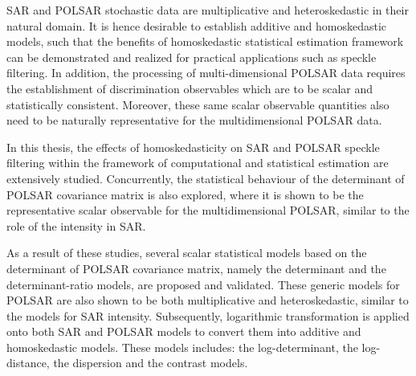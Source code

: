 

\begin{abstracts}        %
{}

SAR and POLSAR stochastic data are multiplicative and heteroskedastic in their natural domain.
It is hence desirable to establish additive and homoskedastic models,
  such that the benefits of homoskedastic statistical estimation framework can be demonstrated and realized for practical applications such as speckle filtering.
In addition, the processing of multi-dimensional POLSAR data requires the establishment of discrimination observables
  which are to be scalar and statistically consistent.
Moreover, these same scalar observable quantities also need to be naturally representative for the multidimensional POLSAR data.

In this thesis, the effects of homoskedasticity on SAR and POLSAR speckle filtering within the framework of computational and statistical estimation are extensively studied. 
Concurrently, the statistical behaviour of the determinant of POLSAR covariance matrix is also explored,
  where it is shown to be the representative scalar observable for the multidimensional POLSAR, similar to the role of the intensity in SAR.

As a result of these studies, several scalar statistical models based on the determinant of POLSAR covariance matrix, namely the determinant and the determinant-ratio models, are proposed and validated.
These generic models for POLSAR are also shown to be both multiplicative and heteroskedastic, similar to the models for SAR intensity. 
Subsequently, logarithmic transformation is applied onto both SAR and POLSAR models
  to convert them into additive and homoskedastic models.
These models includes: the log-determinant, the log-distance, the dispersion and the contrast models.


\end{abstracts}
